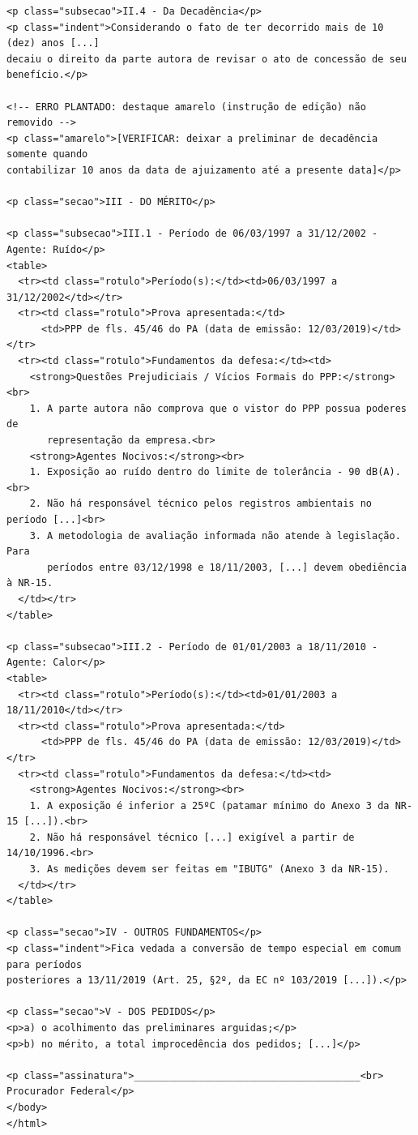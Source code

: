 \documentclass[11pt,a4paper]{article}
\begin{document}
\begin{lstlisting}[style=html]
<p class="subsecao">II.4 - Da Decadência</p>
<p class="indent">Considerando o fato de ter decorrido mais de 10 (dez) anos [...]
decaiu o direito da parte autora de revisar o ato de concessão de seu benefício.</p>

<!-- ERRO PLANTADO: destaque amarelo (instrução de edição) não removido -->
<p class="amarelo">[VERIFICAR: deixar a preliminar de decadência somente quando
contabilizar 10 anos da data de ajuizamento até a presente data]</p>

<p class="secao">III - DO MÉRITO</p>

<p class="subsecao">III.1 - Período de 06/03/1997 a 31/12/2002 - Agente: Ruído</p>
<table>
  <tr><td class="rotulo">Período(s):</td><td>06/03/1997 a 31/12/2002</td></tr>
  <tr><td class="rotulo">Prova apresentada:</td>
      <td>PPP de fls. 45/46 do PA (data de emissão: 12/03/2019)</td></tr>
  <tr><td class="rotulo">Fundamentos da defesa:</td><td>
    <strong>Questões Prejudiciais / Vícios Formais do PPP:</strong><br>
    1. A parte autora não comprova que o vistor do PPP possua poderes de
       representação da empresa.<br>
    <strong>Agentes Nocivos:</strong><br>
    1. Exposição ao ruído dentro do limite de tolerância - 90 dB(A).<br>
    2. Não há responsável técnico pelos registros ambientais no período [...]<br>
    3. A metodologia de avaliação informada não atende à legislação. Para
       períodos entre 03/12/1998 e 18/11/2003, [...] devem obediência à NR-15.
  </td></tr>
</table>

<p class="subsecao">III.2 - Período de 01/01/2003 a 18/11/2010 - Agente: Calor</p>
<table>
  <tr><td class="rotulo">Período(s):</td><td>01/01/2003 a 18/11/2010</td></tr>
  <tr><td class="rotulo">Prova apresentada:</td>
      <td>PPP de fls. 45/46 do PA (data de emissão: 12/03/2019)</td></tr>
  <tr><td class="rotulo">Fundamentos da defesa:</td><td>
    <strong>Agentes Nocivos:</strong><br>
    1. A exposição é inferior a 25ºC (patamar mínimo do Anexo 3 da NR-15 [...]).<br>
    2. Não há responsável técnico [...] exigível a partir de 14/10/1996.<br>
    3. As medições devem ser feitas em "IBUTG" (Anexo 3 da NR-15).
  </td></tr>
</table>

<p class="secao">IV - OUTROS FUNDAMENTOS</p>
<p class="indent">Fica vedada a conversão de tempo especial em comum para períodos
posteriores a 13/11/2019 (Art. 25, §2º, da EC nº 103/2019 [...]).</p>

<p class="secao">V - DOS PEDIDOS</p>
<p>a) o acolhimento das preliminares arguidas;</p>
<p>b) no mérito, a total improcedência dos pedidos; [...]</p>

<p class="assinatura">_______________________________________<br>
Procurador Federal</p>
</body>
</html>
\end{lstlisting}
\end{document}
